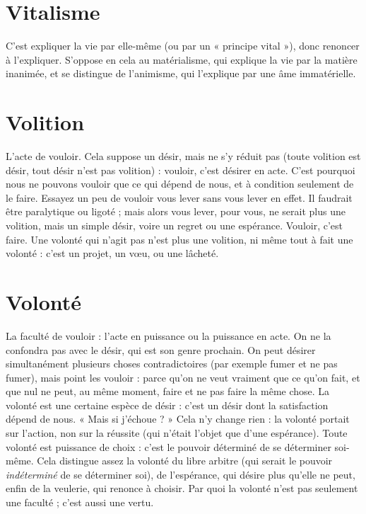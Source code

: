 \section{Vitalisme}
C'est expliquer la vie par elle-même (ou par un « principe
vital »), donc renoncer à l'expliquer. S’oppose en cela au matérialisme,
qui explique la vie par la matière inanimée, et se distingue de l’animisme,
qui l’explique par une âme immatérielle.

\section{Volition}
L'acte de vouloir. Cela suppose un désir, mais ne s’y réduit pas
(toute volition est désir, tout désir n’est pas volition) : vouloir,
c'est désirer en acte. C’est pourquoi nous ne pouvons vouloir que ce qui
dépend de nous, et à condition seulement de le faire. Essayez un peu de vouloir
vous lever sans vous lever en effet. Il faudrait être paralytique ou ligoté ; mais
alors vous lever, pour vous, ne serait plus une volition, mais un simple désir,
voire un regret ou une espérance. Vouloir, c’est faire. Une volonté qui n’agit
pas n’est plus une volition, ni même tout à fait une volonté : c’est un projet, un
vœu, ou une lâcheté.

\section{Volonté}
La faculté de vouloir : l’acte en puissance ou la puissance en
acte.
On ne la confondra pas avec le désir, qui est son genre prochain. On peut
désirer simultanément plusieurs choses contradictoires (par exemple fumer et
ne pas fumer), mais point les vouloir : parce qu’on ne veut vraiment que ce
qu’on fait, et que nul ne peut, au même moment, faire et ne pas faire la même
chose. La volonté est une certaine espèce de désir : c’est un désir dont la satisfaction
dépend de nous. « Mais si j’échoue ? » Cela n’y change rien : la volonté
portait sur l’action, non sur la réussite (qui n’était l’objet que d’une espérance).
Toute volonté est puissance de choix : c’est le pouvoir déterminé de se déterminer
soi-même. Cela distingue assez la volonté du libre arbitre (qui serait le
pouvoir {\it indéterminé} de se déterminer soi), de l’espérance, qui désire plus qu’elle
ne peut, enfin de la veulerie, qui renonce à choisir. Par quoi la volonté n’est pas
seulement une faculté ; c’est aussi une vertu.

